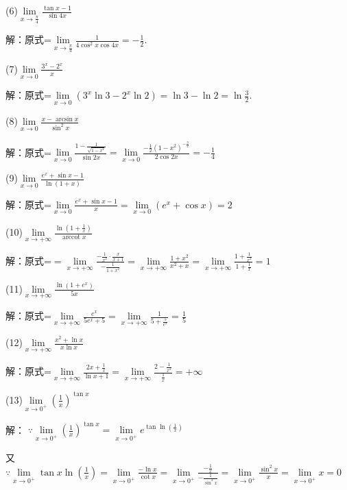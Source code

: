 \documentclass{article}
\begin{document}
\begin{enumerate}[1.]
				(6)$\lim\limits _{x \rightarrow \frac{\pi}{4}} \frac{\tan x-1}{\sin 4 x}$
				
				解：原式=$\lim\limits _{x \rightarrow \frac{\pi}{4}}\frac{1}{4\cos^2 x\cos 4x}=-\frac{1}{2}$.
				
				(7)$\lim\limits _{x \rightarrow 0} \frac{3^{x}-2^{x}}{x}$
				
				解：原式=$\lim\limits_{x \rightarrow 0}(3^x \ln 3-2^x \ln 2)=\ln 3-\ln 2=\ln \frac{3}{2}$.
				
				(8)$\lim\limits _{x \rightarrow 0} \frac{x-\arcsin x}{\sin ^{2} x}$
				
				解：原式=$\lim\limits _{x \rightarrow 0} \frac{1-\frac{1}{\sqrt{1-x^2}}}{\sin 2x}=\lim\limits _{x \rightarrow 0} \frac{-\frac{1}{2}(1-x^2)^{-\frac{3}{2}}}{2\cos 2x}=-\frac{1}{4}$
				
				(9)$\lim\limits _{x \rightarrow 0} \frac{e^{x}+\sin x-1}{\ln (1+x)}$
				
				解：原式=$\lim\limits_{x \rightarrow 0} \frac{e^{x}+\sin x-1}{x}=\lim\limits_{x \rightarrow 0}(e^x+\cos x)=2$
				
				(10)$\lim\limits _{x \rightarrow+\infty} \frac{\ln \left(1+\frac{1}{x}\right)}{\operatorname{arccot} x}$
				
				解：原式=$=\lim\limits _{x \rightarrow+\infty} \frac{-\frac{1}{x^{2}} \cdot \frac{x}{x+1}}{-\frac{1}{1+x^{2}}}=\lim\limits _{x \rightarrow+\infty} \frac{1+x^{2}}{x^{2}+x}=\lim\limits_{x \rightarrow+\infty} \frac{1+\frac{1}{x^{2}}}{1+\frac{1}{x}}=1$
				
				(11)$\lim\limits _{x \rightarrow+\infty} \frac{\ln \left(1+e^{x}\right)}{5 x}$
				
				解：原式=$\lim\limits _{x \rightarrow+\infty}\frac{e^x}{5e^x+5}=\lim\limits _{x \rightarrow+\infty}\frac{1}{5+\frac{5}{e^x}}=\frac{1}{5}$
				
				(12)$\lim\limits _{x \rightarrow+\infty} \frac{x^{2}+\ln x}{x \ln x}$
				
				解：原式=$\lim\limits _{x \rightarrow+\infty}\frac{2x+\frac{1}{x}}{\ln x+1}=\lim\limits _{x \rightarrow+\infty}\frac{2-\frac{1}{x^2}}{\frac{1}{x}}=+\infty$
				
				(13)$\lim\limits_{x \rightarrow 0^{+}}\left(\frac{1}{x}\right)^{\tan x}$
				
				解： $\because \lim\limits _{x \rightarrow 0^{+}}\left(\frac{1}{x}\right)^{\tan x}=\lim\limits _{x \rightarrow 0^{+}} e^{\tan \ln \left(\frac{1}{x}\right)}$
				
				又$ \because \lim\limits _{x \rightarrow 0^{+}} \tan x \ln \left(\frac{1}{x}\right)
				=\lim\limits _{x \rightarrow 0^{+}} \frac{-\ln x}{\cot x}
				=\lim\limits _{x \rightarrow 0^{+}} \frac{-\frac{1}{x}}{-\frac{1}{\sin ^{2} x}}
				=\lim\limits _{x \rightarrow 0^{+}} \frac{\sin ^{2} x}{x}
				=\lim\limits _{x \rightarrow 0^{+}} x=0$ 
				

\end{enumerate}
\end{document}
